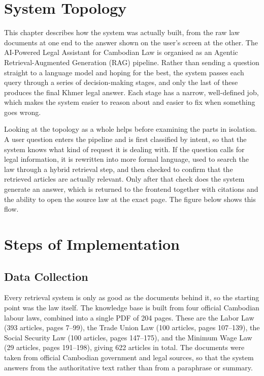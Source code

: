
\section{System Topology}

\hs This chapter describes how the system was actually built, from the raw law
documents at one end to the answer shown on the user's screen at the other. The
AI-Powered Legal Assistant for Cambodian Law is organised as an Agentic
Retrieval-Augmented Generation (RAG) pipeline. Rather than sending a question straight
to a language model and hoping for the best, the system passes each query through a
series of decision-making stages, and only the last of these produces the final Khmer
legal answer. Each stage has a narrow, well-defined job, which makes the system easier
to reason about and easier to fix when something goes wrong.

\hs Looking at the topology as a whole helps before examining the parts in isolation. A
user question enters the pipeline and is first classified by intent, so that the system
knows what kind of request it is dealing with. If the question calls for legal
information, it is rewritten into more formal language, used to search the law through a
hybrid retrieval step, and then checked to confirm that the retrieved articles are
actually relevant. Only after that check does the system generate an answer, which is
returned to the frontend together with citations and the ability to open the source law
at the exact page. The figure below shows this flow.


\section{Steps of Implementation}

\subsection{Data Collection}

\hs Every retrieval system is only as good as the documents behind it, so the starting
point was the law itself. The knowledge base is built from four official Cambodian
labour laws, combined into a single PDF of 204 pages. These are the Labor Law (393
articles, pages 7--99), the Trade Union Law (100 articles, pages 107--139), the Social
Security Law (100 articles, pages 147--175), and the Minimum Wage Law (29 articles,
pages 191--198), giving 622 articles in total. The documents were taken from official
Cambodian government and legal sources, so that the system answers from the authoritative
text rather than from a paraphrase or summary.

